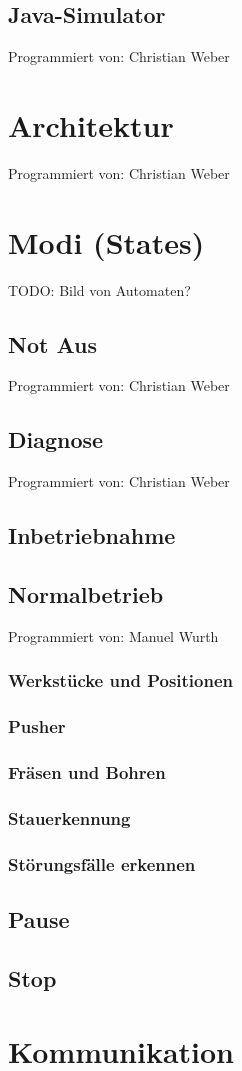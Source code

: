 \documentclass[fontsize=11pt,a4paper,final]{scrartcl}[2003/01/01]
\newcommand*{\manu}{%
	Programmiert von: Manuel Wurth
}
\newcommand*{\chris}{%
	Programmiert von: Christian Weber
}
\begin{document}
\subsection{Java-Simulator}
\chris

\section{Architektur}
\chris
\section{Modi (States)}
TODO: Bild von Automaten?
\subsection{Not Aus}
\chris
\subsection{Diagnose}
\chris

\subsection{Inbetriebnahme}
\subsection{Normalbetrieb}
\manu
\subsubsection{Werkstücke und Positionen}
\subsubsection{Pusher}
\subsubsection{Fräsen und Bohren}
\subsubsection{Stauerkennung}
\subsubsection{Störungsfälle erkennen}
\subsection{Pause}
\subsection{Stop}
\section{Kommunikation}
\end{document}
